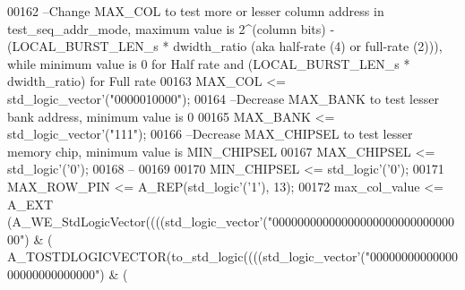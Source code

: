 \begin{DoxyCode}
00162 \textcolor{keyword}{  --Change MAX\_COL to test more or lesser column address in test\_seq\_addr\_mode, maximum value is 2^(column
       bits) - (LOCAL\_BURST\_LEN\_s * dwidth\_ratio (aka half-rate (4) or full-rate (2))), while minimum value is 0
       for Half rate and (LOCAL\_BURST\_LEN\_s * dwidth\_ratio) for Full rate}
00163   \textcolor{vhdlchar}{MAX_COL} \textcolor{vhdlchar}{<=} \textcolor{comment}{std\_logic\_vector}\textcolor{vhdlchar}{'}\textcolor{vhdlchar}{(}\textcolor{vhdllogic}{"0000010000"}\textcolor{vhdlchar}{)};
00164 \textcolor{keyword}{  --Decrease MAX\_BANK to test lesser bank address, minimum value is 0}
00165   \textcolor{vhdlchar}{MAX_BANK} \textcolor{vhdlchar}{<=} \textcolor{comment}{std\_logic\_vector}\textcolor{vhdlchar}{'}\textcolor{vhdlchar}{(}\textcolor{vhdllogic}{"111"}\textcolor{vhdlchar}{)};
00166 \textcolor{keyword}{  --Decrease MAX\_CHIPSEL to test lesser memory chip, minimum value is MIN\_CHIPSEL}
00167   \textcolor{vhdlchar}{MAX_CHIPSEL} \textcolor{vhdlchar}{<=} \textcolor{comment}{std\_logic}\textcolor{vhdlchar}{'}\textcolor{vhdlchar}{(}\textcolor{vhdlchar}{'}\textcolor{vhdllogic}{}\textcolor{vhdllogic}{0}\textcolor{vhdlchar}{'}\textcolor{vhdlchar}{)};
00168 \textcolor{keyword}{  --}
00169 
00170   \textcolor{vhdlchar}{MIN_CHIPSEL} \textcolor{vhdlchar}{<=} \textcolor{comment}{std\_logic}\textcolor{vhdlchar}{'}\textcolor{vhdlchar}{(}\textcolor{vhdlchar}{'}\textcolor{vhdllogic}{}\textcolor{vhdllogic}{0}\textcolor{vhdlchar}{'}\textcolor{vhdlchar}{)};
00171   \textcolor{vhdlchar}{MAX_ROW_PIN} \textcolor{vhdlchar}{<=} \textcolor{vhdlchar}{A\_REP}\textcolor{vhdlchar}{(}\textcolor{comment}{std\_logic}\textcolor{vhdlchar}{'}\textcolor{vhdlchar}{(}\textcolor{vhdlchar}{'}\textcolor{vhdllogic}{}\textcolor{vhdllogic}{1}\textcolor{vhdlchar}{'}\textcolor{vhdlchar}{)}\textcolor{vhdlchar}{,} \textcolor{vhdllogic}{}\textcolor{vhdllogic}{13}\textcolor{vhdlchar}{)};
00172   \textcolor{vhdlchar}{max_col_value} \textcolor{vhdlchar}{<=} \textcolor{vhdlchar}{A\_EXT} \textcolor{vhdlchar}{(}\textcolor{vhdlchar}{A\_WE\_StdLogicVector}\textcolor{vhdlchar}{(}\textcolor{vhdlchar}{(}\textcolor{vhdlchar}{(}\textcolor{vhdlchar}{(}\textcolor{comment}{std\_logic\_vector}\textcolor{vhdlchar}{'}\textcolor{vhdlchar}{(}\textcolor{vhdllogic}{"0000000000000000000000000000000"}\textcolor{vhdlchar}{)} \textcolor{vhdlchar}{&} \textcolor{vhdlchar}{(}\textcolor{vhdlchar}{
      A\_TOSTDLOGICVECTOR}\textcolor{vhdlchar}{(}\textcolor{vhdlchar}{to\_std\_logic}\textcolor{vhdlchar}{(}\textcolor{vhdlchar}{(}\textcolor{vhdlchar}{(}\textcolor{vhdlchar}{(}\textcolor{comment}{std\_logic\_vector}\textcolor{vhdlchar}{'}\textcolor{vhdlchar}{(}\textcolor{vhdllogic}{"0000000000000000000000000000"}\textcolor{vhdlchar}{)} \textcolor{vhdlchar}{&} \textcolor{vhdlchar}{(}\textcolor{vhdlchar}{
}
\end{DoxyCode}
